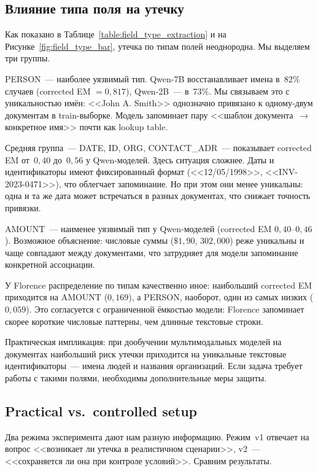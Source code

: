 \documentclass[a4paper,12pt]{extarticle}
\begin{document}
\subsection{Влияние типа поля на утечку}
\label{sec:discussion_field_types}

Как показано в Таблице~\ref{table:field_type_extraction} и на Рисунке~\ref{fig:field_type_bar}, утечка по типам полей неоднородна. Мы выделяем три группы.

PERSON~--- наиболее уязвимый тип. Qwen-7B восстанавливает имена в~82\% случаев (corrected EM $= 0{,}817$), Qwen-2B~--- в~73\%. Мы связываем это с уникальностью имён: <<John A. Smith>> однозначно привязано к одному-двум документам в train-выборке. Модель запоминает пару <<шаблон документа~$\to$ конкретное имя>> почти как lookup table.

Средняя группа~--- DATE, ID, ORG, CONTACT\_ADR~--- показывает corrected EM от~$0{,}40$ до~$0{,}56$ у Qwen-моделей. Здесь ситуация сложнее. Даты и идентификаторы имеют фиксированный формат (<<12/05/1998>>, <<INV-2023-0471>>), что облегчает запоминание. Но при этом они менее уникальны: одна и та же дата может встречаться в разных документах, что снижает точность привязки.

AMOUNT~--- наименее уязвимый тип у Qwen-моделей (corrected EM $0{,}40$--$0{,}46$). Возможное объяснение: числовые суммы ($\$1{,}90$, $302{,}000$) реже уникальны и чаще совпадают между документами, что затрудняет для модели запоминание конкретной ассоциации.

У Florence распределение по типам качественно иное: наибольший corrected EM приходится на AMOUNT ($0{,}169$), а PERSON, наоборот, один из самых низких ($0{,}059$). Это согласуется с ограниченной ёмкостью модели: Florence запоминает скорее короткие числовые паттерны, чем длинные текстовые строки.

Практическая импликация: при дообучении мультимодальных моделей на документах наибольший риск утечки приходится на уникальные текстовые идентификаторы~--- имена людей и названия организаций. Если задача требует работы с такими полями, необходимы дополнительные меры защиты.

\subsection{Practical vs.\ controlled setup}
\label{sec:discussion_v1_v2}

Два режима эксперимента дают нам разную информацию. Режим~v1 отвечает на вопрос <<возникает ли утечка в реалистичном сценарии>>, v2~--- <<сохраняется ли она при контроле условий>>. Сравним результаты.
\end{document}
